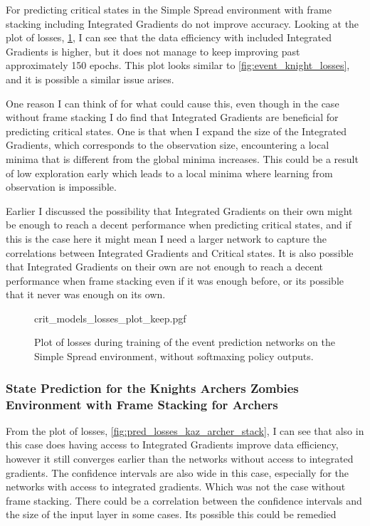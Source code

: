 \documentclass[UKenglish]{uiomasterthesis}
\begin{document}
For predicting critical states in the Simple Spread environment with frame stacking including Integrated Gradients do not improve accuracy. Looking at the plot of losses, \cref{fig:crit_losses_stack}, I can see that the data efficiency with included Integrated Gradients is higher, but it does not manage to keep improving past approximately 150 epochs. This plot looks similar to \cref{fig:event_knight_losses}, and it is possible a similar issue arises.

One reason I can think of for what could cause this, even though in the case without frame stacking I do find that Integrated Gradients are beneficial for predicting critical states. One is that when I expand the size of the Integrated Gradients, which corresponds to the observation size, encountering a local minima that is different from the global minima increases. This could be a result of low exploration early which leads to a local minima where learning from observation is impossible.

Earlier I discussed the possibility that Integrated Gradients on their own might be enough to reach a decent performance when predicting critical states, and if this is the case here it might mean I need a larger network to capture the correlations between Integrated Gradients and Critical states. It is also possible that Integrated Gradients on their own are not enough to reach a decent performance when frame stacking even if it was enough before, or its possible that it never was enough on its own. 

\begin{figure}[hbtp]
    \centering
    {crit_models_losses_plot_keep.pgf}
    \caption{Plot of losses during training of the event prediction networks on the Simple Spread environment, without softmaxing policy outputs.}
	\label{fig:crit_losses_stack}
\end{figure}

\subsubsection{State Prediction for the Knights Archers Zombies Environment with Frame Stacking for Archers}

From the plot of losses, \cref{fig:pred_losses_kaz_archer_stack}, I can see that also in this case does having access to Integrated Gradients improve data efficiency, however it still converges earlier than the networks without access to integrated gradients. The confidence intervals are also wide in this case, especially for the networks with access to integrated gradients. Which was not the case without frame stacking. There could be a correlation between the confidence intervals and the size of the input layer in some cases. Its possible this could be remedied  
\end{document}
